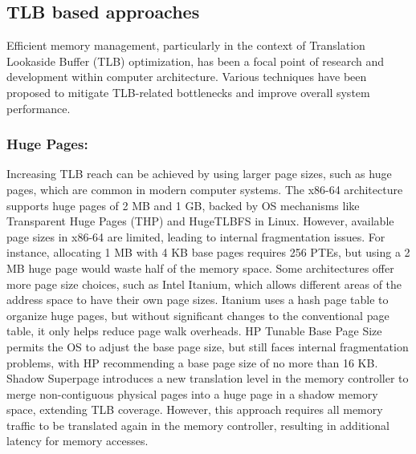 \subsection{TLB based approaches}
Efficient memory management, particularly in the context of 
Translation Lookaside Buffer (TLB) optimization, has been a focal point of 
research and development within computer architecture. Various techniques have been 
proposed to mitigate TLB-related bottlenecks and improve overall system performance.

\subsubsection{Huge Pages:}
Increasing TLB reach can be achieved by using larger page sizes, such as huge pages, which are common in modern computer systems. 
The x86-64 architecture supports huge pages of 2 MB and 1 GB, backed by OS mechanisms like Transparent Huge Pages (THP) 
and HugeTLBFS in Linux. However, available page sizes in x86-64 are limited, leading to internal fragmentation issues. 
For instance, allocating 1 MB with 4 KB base pages requires 256 PTEs, but using a 2 MB huge page would waste 
half of the memory space. Some architectures offer more page size choices, such as Intel Itanium, which 
allows different areas of the address space to have their own page sizes. Itanium uses a hash page table to organize huge 
pages, but without significant changes to the conventional page table, it only helps reduce page walk overheads. 
HP Tunable Base Page Size permits the OS to adjust the base page size, but still faces internal fragmentation problems, 
with HP recommending a base page size of no more than 16 KB. Shadow Superpage introduces a new translation level 
in the memory controller to merge non-contiguous physical pages into a huge page in a shadow memory space, extending 
TLB coverage. However, this approach requires all memory traffic to be translated again in the memory controller, 
resulting in additional latency for memory accesses.

